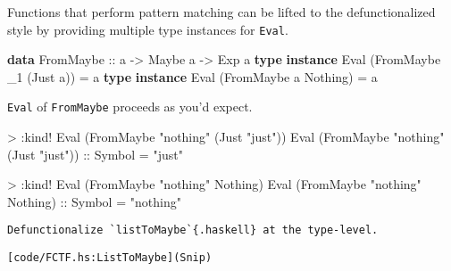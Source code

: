 \documentclass[
  11pt,
]{book}
\newenvironment{Shaded}{}{}
\newcommand{\DataTypeTok}[1]{\textcolor[rgb]{0.56,0.13,0.00}{#1}}
\newcommand{\KeywordTok}[1]{\textcolor[rgb]{0.00,0.44,0.13}{\textbf{#1}}}
\newcommand{\NormalTok}[1]{#1}
\newcommand{\OperatorTok}[1]{\textcolor[rgb]{0.40,0.40,0.40}{#1}}
\newcommand{\OtherTok}[1]{\textcolor[rgb]{0.00,0.44,0.13}{#1}}
\newcommand{\StringTok}[1]{\textcolor[rgb]{0.25,0.44,0.63}{#1}}
\theoremstyle{nonumberplain}
\begin{document}
Functions that perform pattern matching can be lifted to the
defunctionalized style by providing multiple type instances for
\texttt{Eval}.

\begin{Shaded}
\begin{Highlighting}[]
\KeywordTok{data} \DataTypeTok{FromMaybe}\OtherTok{ ::}\NormalTok{ a }\OtherTok{{-}\textgreater{}} \DataTypeTok{Maybe}\NormalTok{ a }\OtherTok{{-}\textgreater{}} \DataTypeTok{Exp}\NormalTok{ a}
\KeywordTok{type} \KeywordTok{instance} \DataTypeTok{Eval}\NormalTok{ (}\DataTypeTok{FromMaybe}\NormalTok{ \_1 (}\DataTypeTok{\textquotesingle{}Just}\NormalTok{ a)) }\OtherTok{=}\NormalTok{ a}
\KeywordTok{type} \KeywordTok{instance} \DataTypeTok{Eval}\NormalTok{ (}\DataTypeTok{FromMaybe}\NormalTok{ a }\DataTypeTok{\textquotesingle{}Nothing}\NormalTok{)   }\OtherTok{=}\NormalTok{ a}
\end{Highlighting}
\end{Shaded}

\texttt{Eval} of \texttt{FromMaybe} proceeds as you'd expect.

\begin{Shaded}
\begin{Highlighting}[]
\OperatorTok{\textgreater{}} \OperatorTok{:}\NormalTok{kind}\OperatorTok{!} \DataTypeTok{Eval}\NormalTok{ (}\DataTypeTok{FromMaybe} \StringTok{"nothing"}\NormalTok{ (}\DataTypeTok{\textquotesingle{}Just} \StringTok{"just"}\NormalTok{))}
\DataTypeTok{Eval}\NormalTok{ (}\DataTypeTok{FromMaybe} \StringTok{"nothing"}\NormalTok{ (}\DataTypeTok{\textquotesingle{}Just} \StringTok{"just"}\NormalTok{))}\OtherTok{ ::} \DataTypeTok{Symbol}
\OtherTok{=} \StringTok{"just"}


\OperatorTok{\textgreater{}} \OperatorTok{:}\NormalTok{kind}\OperatorTok{!} \DataTypeTok{Eval}\NormalTok{ (}\DataTypeTok{FromMaybe} \StringTok{"nothing"} \DataTypeTok{\textquotesingle{}Nothing}\NormalTok{)}
\DataTypeTok{Eval}\NormalTok{ (}\DataTypeTok{FromMaybe} \StringTok{"nothing"} \DataTypeTok{\textquotesingle{}Nothing}\NormalTok{)}\OtherTok{ ::} \DataTypeTok{Symbol}
\OtherTok{=} \StringTok{"nothing"}
\end{Highlighting}
\end{Shaded}

\begin{verbatim}
Defunctionalize `listToMaybe`{.haskell} at the type-level.
\end{verbatim}

\begin{verbatim}
[code/FCTF.hs:ListToMaybe](Snip)
\end{verbatim}
\end{document}
